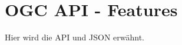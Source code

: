 \section{\acs{OGC} \acs{API} - Features}
\label{section:ogc}

Hier wird die \ac{API} und \ac{JSON} erwähnt.

